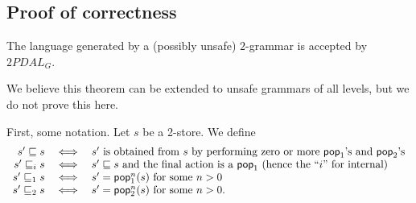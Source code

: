 
\subsection{Proof of correctness}

\begin{theorem}\label{labels}The language generated by a (possibly unsafe)
$2$-grammar is accepted by $2PDAL_G$.
\end{theorem}

\begin{remark} We believe this theorem can be extended to unsafe
grammars of all levels, but we do not prove this here.
\end{remark}

First, some notation. Let $s$ be a 2-store. We define
\[\begin{array}{rll}
s' \sqsubseteq s & \iff & \hbox{$s'$ is obtained from $s$
by performing zero or more ${\sf pop}_1$'s and ${\sf pop}_2$'s} \\
s' \sqsubseteq_i s & \iff & \hbox{$s'\sqsubseteq s$ and the final action
is a ${\sf pop}_1$ (hence the ``$i$'' for internal)}\\
s' \sqsubseteq_1 s & \iff & \hbox{$s' =
{\sf pop}_1^n(s)$ for some $n > 0$}\\
s' \sqsubseteq_2 s & \iff & \hbox{$s' = {\sf pop}_2^n(s)$ for some $n > 0$.}
\end{array}\]

